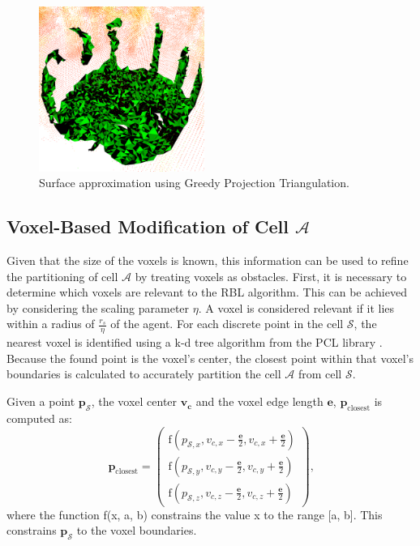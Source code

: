             \begin{figure}[htbp]
                \centering
                \includegraphics[width=0.48\textwidth]{./fig/rviz/triangulation_surface_aprox.png}
                \caption{
                    Surface approximation using Greedy Projection Triangulation.
                }
                \label{fig:triangulation}
            \end{figure}

        \subsection{Voxel-Based Modification of Cell $\mathcal{A}$}
            Given that the size of the voxels is known, this information can be used to refine the partitioning of cell $\mathcal{A}$ by treating voxels as obstacles.
            First, it is necessary to determine which voxels are relevant to the \ac{RBL} algorithm.
            This can be achieved by considering the scaling parameter $\eta$.
            A voxel is considered relevant if it lies within a radius of $\frac{r_s}{\eta}$ of the agent.
            For each discrete point in the cell $\mathcal{S}$, the nearest voxel is identified using a k-d tree algorithm from the \ac{PCL} library \cite{kd_tree}.
            Because the found point is the voxel's center, the closest point within that voxel's boundaries is calculated to accurately partition the cell $\mathcal{A}$ from cell $\mathcal{S}$.

            Given a point $\mathbf{p_{\mathcal{S}}}$, the voxel center $\mathbf{v_c}$ and the voxel edge length $\mathbf{e}$, $\mathbf{p}_{\text{closest}}$ is computed as: 
            \begin{equation}
                \mathbf{p}_{\text{closest}} =
                \begin{pmatrix}
                    \text{f}(p_{\mathcal{S},x}, v_{c,x} - \frac{\mathbf{e}}{2}, v_{c,x} + \frac{\mathbf{e}}{2}) \\
                    \text{f}(p_{\mathcal{S},y}, v_{c,y} - \frac{\mathbf{e}}{2}, v_{c,y} + \frac{\mathbf{e}}{2}) \\
                    \text{f}(p_{\mathcal{S},z}, v_{c,z} - \frac{\mathbf{e}}{2}, v_{c,z} + \frac{\mathbf{e}}{2})
                \end{pmatrix}\text{,}
            \end{equation}
            where the function f(x, a, b) constrains the value x to the range [a, b].
            This constrains $\mathbf{p_{\mathcal{S}}}$ to the voxel boundaries.
            
